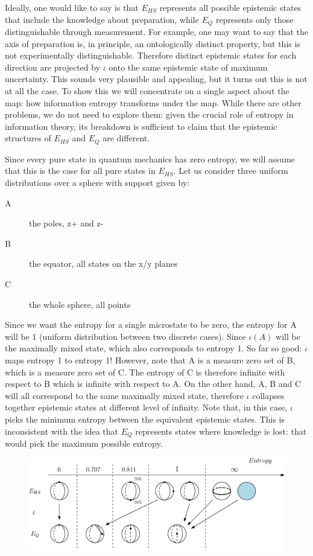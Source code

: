 \documentclass[twocolumn,prl,floatfix,superscriptaddress]{revtex4-2}
\begin{document}
Ideally, one would like to say is that $E_{HS}$ represents all possible epistemic states that include the knowledge about preparation, while $E_{Q}$ represents only those distinguishable through measurement. For example, one may want to say that the axis of preparation is, in principle, an ontologically distinct property, but this is not experimentally distinguishable. Therefore distinct epistemic states for each direction are projected by $\iota$ onto the same epistemic state of maximum uncertainty. This sounds very plausible and appealing, but it turns out this is not at all the case. To show this we will concentrate on a single aspect about the map: how information entropy transforms under the map. While there are other problems, we do not need to explore them: given the crucial role of entropy in information theory, its breakdown is sufficient to claim that the epistemic structures of $E_{HS}$ and $E_{Q}$ are different.

Since every pure state in quantum mechanics has zero entropy, we will assume that this is the case for all pure states in $E_{HS}$. Let us consider three uniform distributions over a sphere with support given by:
\begin{description}
	\item[A] the poles, z+ and z-
	\item[B] the equator, all states on the x/y planes
	\item[C] the whole sphere, all points
\end{description}
Since we want the entropy for a single microstate to be zero, the entropy for A will be 1 (uniform distribution between two discrete cases). Since $\iota(A)$ will be the maximally mixed state, which also corresponds to entropy 1. So far so good: $\iota$ maps entropy 1 to entropy 1! However, note that A is a measure zero set of B, which is a measure zero set of C. The entropy of C is therefore infinite with respect to B which is infinite with respect to A. On the other hand, A, B and C will all correspond to the same maximally mixed state, therefore $\iota$ collapses together epistemic states at different level of infinity. Note that, in this case, $\iota$ picks the minimum entropy between the equivalent epistemic states. This is inconsistent with the idea that $E_{Q}$ represents states where knowledge is lost: that would pick the maximum possible entropy.

\begin{figure}
\includegraphics[scale=.4]{fig2}
\caption{\footnotesize{}}
\end{figure}
\end{document}
